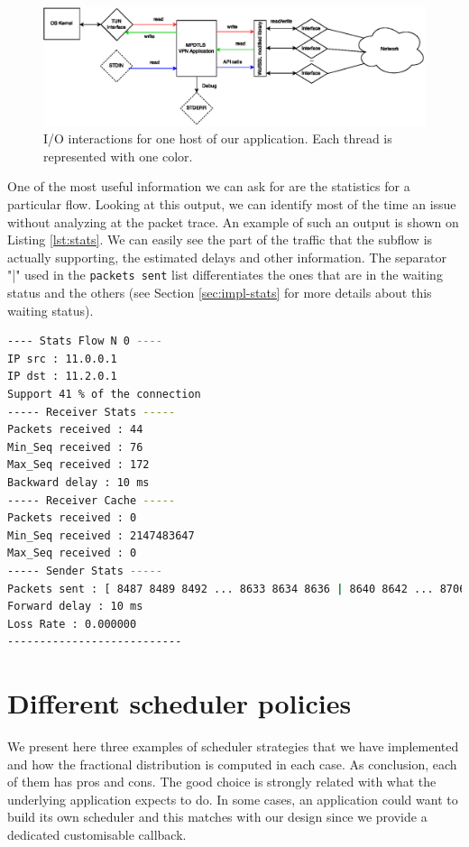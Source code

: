 \begin{figure}[!ht]
\centering
\includegraphics[width=\textwidth]{images/tunneling-IO.eps}
\caption[I/O interactions for one host of our application]{I/O interactions for one host of our application. Each thread is represented with one color.} 
\label{fig:vpn-io}
\end{figure}

One of the most useful information we can ask for are the statistics for a particular flow. Looking at this output, we can identify most of the time an issue without analyzing at the packet trace. An example of such an output is shown on Listing \ref{lst:stats}. We can easily see the part of the traffic that the subflow is actually supporting, the estimated delays and other information. The separator "|" used in the \texttt{packets sent} list differentiates the ones that are in the waiting status and the others (see Section \ref{sec:impl-stats} for more details about this waiting status).

\begin{lstlisting}[language=bash,caption=An output of the statistics for a particular flow,label=lst:stats]
---- Stats Flow N 0 ---- 
IP src : 11.0.0.1 
IP dst : 11.2.0.1 
Support 41 % of the connection
----- Receiver Stats ----- 
Packets received : 44 
Min_Seq received : 76 
Max_Seq received : 172 
Backward delay : 10 ms
----- Receiver Cache ----- 
Packets received : 0 
Min_Seq received : 2147483647 
Max_Seq received : 0 
----- Sender Stats ----- 
Packets sent : [ 8487 8489 8492 ... 8633 8634 8636 | 8640 8642 ... 8706 8707] 
Forward delay : 10 ms
Loss Rate : 0.000000 
---------------------------

\end{lstlisting}

\section{Different scheduler policies}\label{sec:perf-sched}

We present here three examples of scheduler strategies that we have implemented and how the fractional distribution is computed in each case. As conclusion, each of them has pros and cons. The good choice is strongly related with what the underlying application expects to do. In some cases, an application could want to build its own scheduler and this matches with our design since we provide a dedicated customisable callback.


